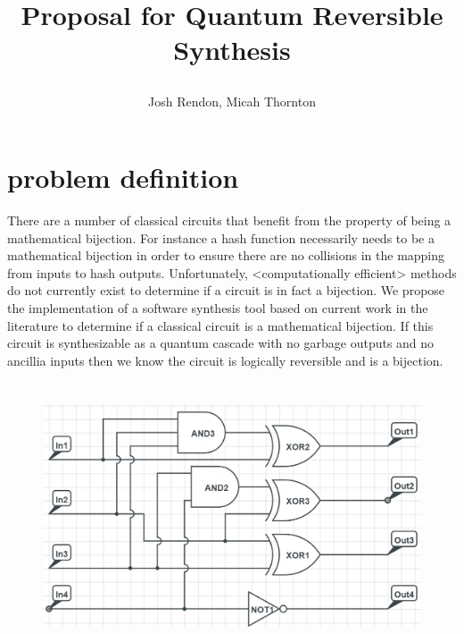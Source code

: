 \documentclass{report}
\title {\author{ Josh Rendon, Micah Thornton} Proposal for Quantum Reversible Synthesis}
\begin{document}
\maketitle{}
\begin{abstract}
\end{abstract}
\section{problem definition}
There are a number of classical circuits that benefit from the property of being a mathematical bijection. For instance a hash function necessarily needs
to be a mathematical bijection in order to ensure there are no collisions in the mapping from inputs to hash outputs. 
Unfortunately, <computationally efficient> methods do not currently exist to determine if a circuit is in fact a bijection.
We propose the implementation of a software synthesis tool based on current work in the literature to determine if a classical circuit is a mathematical bijection.
If this circuit is synthesizable as a quantum cascade with no garbage outputs and no ancillia inputs then we know the circuit is logically reversible and is a bijection.
\section{ }

\begin{figure}
  \includegraphics{figures/4-bit_circular_hash_schematic.PNG}
\end{figure}
\end{document}

